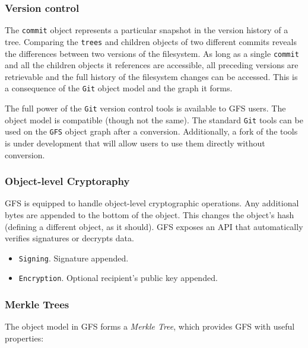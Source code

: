 \documentclass{sig-alternate}
\begin{document}
\subsubsection{Version control}

The \texttt{commit} object represents a particular snapshot in the version
history of a tree. Comparing the \texttt{trees} and children objects of two
different commits reveals the differences between two versions of the
filesystem. As long as a single \texttt{commit} and all the children objects
it references are accessible, all preceding versions are retrievable and the
full history of the filesystem changes can be accessed. This is a consequence
of the \texttt{Git} object model and the graph it forms.

The full power of the \texttt{Git} version control tools is available to GFS
users. The object model is compatible (though not the same). The standard
\texttt{Git} tools can be used on the \texttt{GFS} object graph after a
conversion. Additionally, a fork of the tools is under development that will
allow users to use them directly without conversion.

\subsubsection{Object-level Cryptoraphy}

GFS is equipped to handle object-level cryptographic operations. Any additional
bytes are appended to the bottom of the object. This changes the object's hash
(defining a different object, as it should). GFS exposes an API that
automatically verifies signatures or decrypts data.

\begin{itemize}
  \item \texttt{Signing}. Signature appended.
  \item \texttt{Encryption}. Optional recipient's public key appended.
\end{itemize}

\subsubsection{Merkle Trees}

The object model in GFS forms a \textit{Merkle Tree}, which provides GFS with
useful properties:
\end{document}
